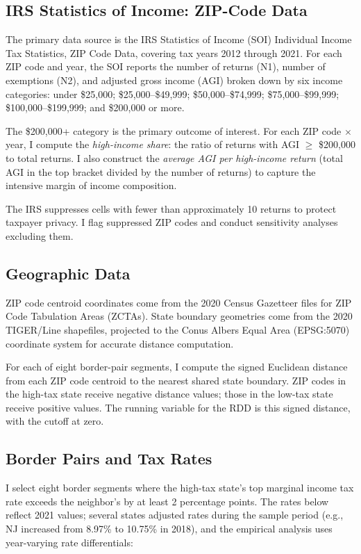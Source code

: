 \documentclass[12pt]{article}
\begin{document}
\subsection{IRS Statistics of Income: ZIP-Code Data}

The primary data source is the IRS Statistics of Income (SOI) Individual Income Tax Statistics, ZIP Code Data, covering tax years 2012 through 2021. For each ZIP code and year, the SOI reports the number of returns (N1), number of exemptions (N2), and adjusted gross income (AGI) broken down by six income categories: under \$25,000; \$25,000--\$49,999; \$50,000--\$74,999; \$75,000--\$99,999; \$100,000--\$199,999; and \$200,000 or more.

The \$200,000+ category is the primary outcome of interest. For each ZIP code $\times$ year, I compute the \textit{high-income share}: the ratio of returns with AGI $\geq$ \$200,000 to total returns. I also construct the \textit{average AGI per high-income return} (total AGI in the top bracket divided by the number of returns) to capture the intensive margin of income composition.

The IRS suppresses cells with fewer than approximately 10 returns to protect taxpayer privacy. I flag suppressed ZIP codes and conduct sensitivity analyses excluding them.

\subsection{Geographic Data}

ZIP code centroid coordinates come from the 2020 Census Gazetteer files for ZIP Code Tabulation Areas (ZCTAs). State boundary geometries come from the 2020 TIGER/Line shapefiles, projected to the Conus Albers Equal Area (EPSG:5070) coordinate system for accurate distance computation.

For each of eight border-pair segments, I compute the signed Euclidean distance from each ZIP code centroid to the nearest shared state boundary. ZIP codes in the high-tax state receive negative distance values; those in the low-tax state receive positive values. The running variable for the RDD is this signed distance, with the cutoff at zero.

\subsection{Border Pairs and Tax Rates}

I select eight border segments where the high-tax state's top marginal income tax rate exceeds the neighbor's by at least 2 percentage points. The rates below reflect 2021 values; several states adjusted rates during the sample period (e.g., NJ increased from 8.97\% to 10.75\% in 2018), and the empirical analysis uses year-varying rate differentials:
\end{document}
